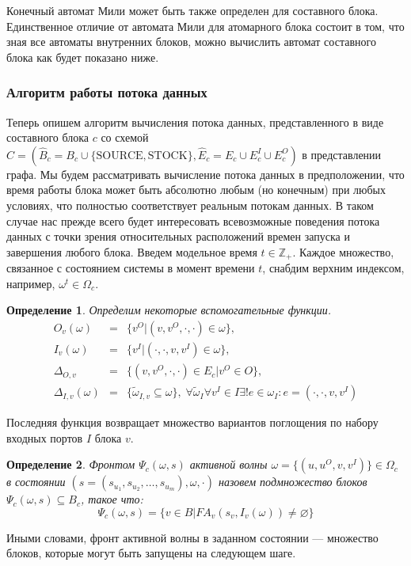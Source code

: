 \documentclass[10pt,a4paper]{article}
\newtheorem{defen}{Определение}
\newcommand{\stock}{\text{STOCK}}
\newcommand{\source}{\text{SOURCE}}
\newcommand{\FA}{F\!A}
\begin{document}
Конечный автомат Мили может быть также определен для составного блока. Единственное отличие от автомата Мили для атомарного блока состоит в том, что
зная все автоматы внутренних блоков, можно вычислить автомат составного блока как будет показано ниже.

\subsubsection{Алгоритм работы потока данных}
Теперь опишем алгоритм вычисления потока данных, представленного в виде составного блока $c$ со схемой
$C = (\hat{B}_c = B_c \cup \{\source, \stock\}, \hat{E}_c= E_c \cup E^I_c \cup E^O_c)$ в представлении графа.
Мы будем рассматривать вычисление потока данных в предположении,
что время работы блока может быть абсолютно любым (но конечным) при любых условиях, что полностью соответствует реальным потокам данных.
В таком случае нас прежде всего будет интересовать всевозможные поведения потока данных с точки зрения относительных расположений времен запуска и завершения любого блока.
Введем модельное время $t \in \mathbb{Z}_+$.
Каждое множество, связанное с состоянием системы в момент времени $t$, снабдим верхним индексом, например, $\omega^t \in \Omega_c$.

\begin{defen}
  Определим некоторые вспомогательные функции.
  \begin{eqnarray*}
    O_v(\omega) & = & \{v^O \vert (v, v^O, \cdot, \cdot) \in \omega\}, \\
    I_v(\omega) & = & \{v^I \vert (\cdot, \cdot, v, v^I) \in \omega\}, \\
    \Delta_{O, v} & = & \{(v, v^O, \cdot, \cdot) \in E_c \vert v^O \in O\}, \\
    \Delta_{I, v} (\omega) & = & \{\tilde \omega_{I, v} \subseteq \omega \}, \; \forall \tilde \omega_I \forall v^I \in I \exists ! e \in \omega_I: e = (\cdot, \cdot, v, v^I)
  \end{eqnarray*}
\end{defen}
Последняя функция возвращает множество вариантов поглощения по набору входных портов $I$ блока $v$.

\begin{defen}
  Фронтом $\Psi_c (\omega, s)$ активной волны $\omega = \{(u, u^O, v, v^I)\} \in \Omega_c$ в состоянии $(s = (s_{u_1}, s_{u_2}, \dots, s_{u_m}), \omega, \cdot)$
  назовем подмножество блоков $\Psi_c (\omega, s) \subseteq B_c$, такое что:
  $$\Psi_c (\omega, s) = \{ v \in B \vert \FA_v(s_v, I_v(\omega)) \neq \varnothing\}$$
\end{defen}
Иными словами, фронт активной волны в заданном состоянии --- множество блоков, которые могут быть запущены на следующем шаге.
\end{document}
